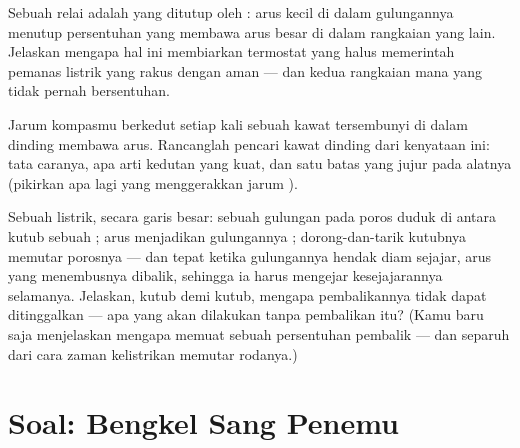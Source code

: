 \begin{exercise}[$\star\star$]\label{exo:g8:electric-current-effects:10}
Sebuah relai adalah  yang ditutup oleh : arus
kecil di dalam gulungannya menutup persentuhan yang membawa arus besar
di dalam rangkaian yang lain. Jelaskan mengapa hal ini membiarkan
termostat yang halus memerintah pemanas listrik yang rakus dengan
aman --- dan kedua rangkaian mana yang tidak pernah bersentuhan.
\end{exercise}

\begin{exercise}[$\star\star$]\label{exo:g8:electric-current-effects:11}
Jarum kompasmu berkedut setiap kali sebuah kawat tersembunyi di dalam
dinding membawa arus. Rancanglah pencari kawat dinding dari kenyataan
ini: tata caranya, apa arti kedutan yang kuat, dan satu batas yang
jujur pada alatnya (pikirkan apa lagi yang menggerakkan jarum ).
\end{exercise}

\begin{exercise}[$\star\star\star$]\label{exo:g8:electric-current-effects:12}
Sebuah  listrik, secara garis besar: sebuah gulungan pada poros
duduk di antara kutub sebuah ; arus menjadikan gulungannya
; dorong-dan-tarik kutubnya memutar porosnya --- dan tepat
ketika gulungannya hendak diam sejajar, arus yang menembusnya dibalik,
sehingga ia harus mengejar kesejajarannya selamanya. Jelaskan, kutub
demi kutub, mengapa pembalikannya tidak dapat ditinggalkan --- apa yang
akan dilakukan  tanpa pembalikan itu? (Kamu baru saja
menjelaskan mengapa  memuat sebuah persentuhan pembalik --- dan
separuh dari cara zaman kelistrikan memutar rodanya.)
\end{exercise}

\section{Soal: Bengkel Sang Penemu}


